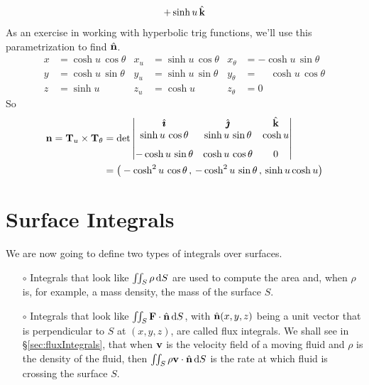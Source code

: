 \begin{eg}
\begin{align*}
      +\sinh u\,\hat{\mathbf{k}}
\end{align*}
As an exercise in working with hyperbolic trig functions, we'll use this
parametrization to find $\hat{\mathbf{n}}$. 
\begin{align*}
x&=  \cosh u\,\cos\theta &
x_u&=  \sinh u\,\cos\theta &
x_\theta&=  -\cosh u\,\sin\theta \\
%
y&= \cosh u\,\sin\theta &
y_u&= \sinh u\,\sin\theta &
y_\theta&= \phantom{-}\cosh u\,\cos\theta \\
%
z&=\sinh u &
z_u&=\cosh u &
z_\theta&=0
\end{align*}
So
\begin{align*}
\mathbf{n} = \mathbf{T}_u\times\mathbf{T}_\theta
&=\det\left|\begin{matrix}
            \hat{\pmb{\imath}} &  \hat{\pmb{\jmath}} & \hat{\mathbf{k}} \\
            \sinh u\,\cos\theta &
               \sinh u\,\sin\theta &
               \cosh u \\[0.1in]
           -\cosh u\,\sin\theta  &
            \cosh u\,\cos\theta &
             0
           \end{matrix}\right| \\
&=\big(-\cosh^2u\,\cos\theta\,,\,
       -\cosh^2u\,\sin\theta\,,\,
       \sinh u\cosh u\big)
\end{align*}
\end{eg}


\section{Surface Integrals}\label{sec:surfaceIntegrals}

We are now going to define two types of integrals over surfaces.
\begin{itemize}
\item[$\circ$]
  Integrals that look like $\iint_S \rho\,\mathrm{d}S$ are used to
compute the area and, when $\rho$ is, for example, a mass density,
the mass of the surface $S$.
\item[$\circ$]
  Integrals that look like $\iint_S \mathbf{F}\cdot\hat{\mathbf{n}}\,\mathrm{d}S$,
with $\hat{\mathbf{n}}(x,y,z)$ being a unit vector that is perpendicular to 
$S$ at $(x,y,z)$,  are called
flux integrals. We shall see in \S\ref{sec:fluxIntegrals}, that when
$\mathbf{v}$ is the velocity field of a moving fluid and $\rho$ is the density
of the fluid, then $\iint_S \rho\mathbf{v}\cdot\hat{\mathbf{n}}\,\mathrm{d}S$ is the rate at which
fluid is crossing the surface $S$.
\end{itemize}

